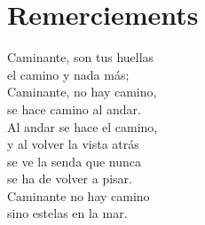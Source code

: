 \chapter*{Remerciements}
\renewcommand\chapterillustration{REM/REM}
\ThisULCornerWallPaper{1}{\chapterillustration}

\begin{fquote}
	\begin{flushright}
		Caminante, son tus huellas\\
		el camino y nada más;\\
		Caminante, no hay camino,\\
		se hace camino al andar.\\
		Al andar se hace el camino,\\
		y al volver la vista atrás\\
		se ve la senda que nunca\\
		se ha de volver a pisar.\\
		Caminante no hay camino\\
		sino estelas en la mar.\\
	\end{flushright}
\end{fquote}

\lettrine[lines=4, slope=-0.5em]{}{}